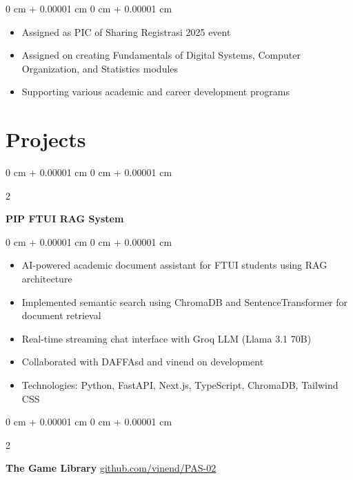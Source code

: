 \documentclass[10pt, letterpaper]{article}
\newenvironment{highlights}{
    \begin{itemize}[
        topsep=0.10 cm,
        parsep=0.10 cm,
        partopsep=0pt,
        itemsep=0pt,
        leftmargin=0 cm + 10pt
    ]
}{
    \end{itemize}
} %
\newenvironment{onecolentry}{
    \begin{adjustwidth}{
        0 cm + 0.00001 cm
    }{
        0 cm + 0.00001 cm
    }
}{
    \end{adjustwidth}
} %
\newenvironment{twocolentry}[2][]{
    \onecolentry
    \def\secondColumn{#2}
    \setcolumnwidth{\fill, 4.5 cm}
    \begin{paracol}{2}
}{
    \switchcolumn \raggedleft \secondColumn
    \end{paracol}
    \endonecolentry
} %
\begin{document}
        \vspace{0.10 cm}
        \begin{onecolentry}
            \begin{highlights}
                \item Assigned as PIC of Sharing Registrasi 2025 event
                \item Assigned on creating Fundamentals of Digital Systems, Computer Organization, and Statistics modules
                \item Supporting various academic and career development programs
            \end{highlights}
        \end{onecolentry}





    
    \section{Projects}



        
        \begin{twocolentry}{

        }
            \textbf{PIP FTUI RAG System}\end{twocolentry}

        \vspace{0.10 cm}
        \begin{onecolentry}
            \begin{highlights}
                \item AI-powered academic document assistant for FTUI students using RAG architecture
                \item Implemented semantic search using ChromaDB and SentenceTransformer for document retrieval
                \item Real-time streaming chat interface with Groq LLM (Llama 3.1 70B)
                \item Collaborated with DAFFAsd and vinend on development
                \item Technologies: Python, FastAPI, Next.js, TypeScript, ChromaDB, Tailwind CSS
            \end{highlights}
        \end{onecolentry}


        \vspace{0.2 cm}

        \begin{twocolentry}{
            \href{https://github.com/vinend/PAS-02}{github.com/vinend/PAS-02}
        }
            \textbf{The Game Library}\end{twocolentry}
\end{document}
